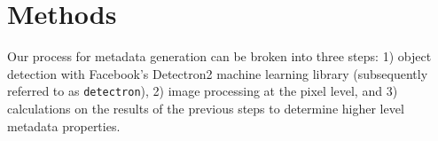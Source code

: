 \documentclass[conference]{IEEEtran}
\begin{document}





\section{Methods}
Our process for metadata generation can be broken into three steps: 1) object detection with Facebook's Detectron2 machine learning library (subsequently referred to as \verb|detectron|), 2) image processing at the pixel level, and 3) calculations on the results of the previous steps to determine higher level metadata properties.
\end{document}
